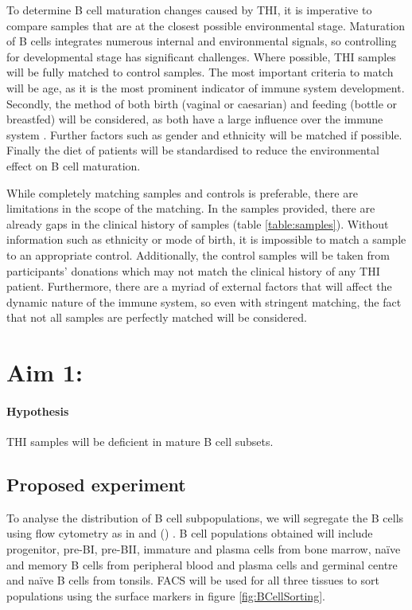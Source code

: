 \documentclass[12pt]{article}
\newcommand{\naive}{na\"{i}ve }
\begin{document}
			To determine B cell maturation changes caused by THI, it is imperative to compare samples that are at the closest possible environmental stage.
			Maturation of B cells integrates numerous internal and environmental signals, so controlling for developmental stage has significant challenges. 
			Where possible, THI samples will be fully matched to control samples. 
			The most important criteria to match will be age, as it is the most prominent indicator of immune system development. 
			Secondly, the method of both birth (vaginal or caesarian) and feeding (bottle or breastfed) will be considered, as both have a large influence over the immune system \citep{Jakobsson14,Cho13,Brandtzaeg03,Rogier14,Gomez14}.
			Further factors such as gender and ethnicity will be matched if possible. 
			Finally the diet of patients will be standardised to reduce the environmental effect on B cell maturation.
			
			While completely matching samples and controls is preferable, there are limitations in the scope of the matching. 
			In the samples provided, there are already gaps in the clinical history of samples (table \ref{table:samples}). 
			Without information such as ethnicity or mode of birth, it is impossible to match a sample to an appropriate control. 
			Additionally, the control samples will be taken from participants' donations which may not match the clinical history of any THI patient.
			Furthermore, there are a myriad of external factors that will affect the dynamic nature of the immune system, so even with stringent matching, the fact that not all samples are perfectly matched will be considered.
		 
	
	\section{Aim 1:}
	
		\paragraph{Hypothesis} THI samples will be deficient in mature B cell subsets.
		
		\subsection{Proposed experiment}
		
				To analyse the distribution of B cell subpopulations, we will segregate the B cells using flow cytometry as in \citet{Kulis15} and \citeauthor{Oakes16} (\citeyear{Oakes16}) \citep{Oakes16}.
				B cell populations obtained will include progenitor, pre-BI, pre-BII, immature and plasma cells from bone marrow, \naive and memory B cells from peripheral blood and plasma cells and germinal centre and \naive B cells from tonsils. 
				FACS will be used for all three tissues to sort populations using the surface markers in figure \ref{fig:BCellSorting}.
				
\end{document}
